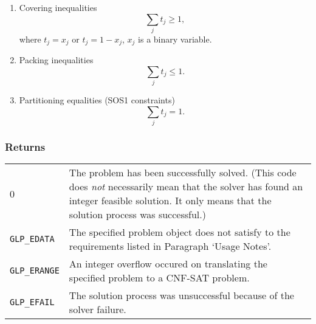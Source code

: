\documentclass[11pt,draft]{article}
\begin{document}
\begin{enumerate}
\item Covering inequalities
$$\sum_{j}t_j\geq 1,$$
where $t_j=x_j$ or $t_j=1-x_j$, $x_j$ is a binary variable.

\item Packing inequalities
$$\sum_{j}t_j\leq 1.$$

\item Partitioning equalities (SOS1 constraints)
$$\sum_{j}t_j=1.$$
\end{enumerate}

\subsubsection*{Returns}

\begin{tabular}{@{}p{25mm}p{97.3mm}@{}}
0 & The problem has been successfully solved. (This code does {\it not}
necessarily mean that the solver has found an integer feasible solution.
It only means that the solution process was successful.)\\

\verb|GLP_EDATA| & The specified problem object does not satisfy to the
requirements listed in Paragraph `Usage Notes'.\\

\verb|GLP_ERANGE| & An integer overflow occured on translating the
specified problem to a CNF-SAT problem.\\

\verb|GLP_EFAIL| & The solution process was unsuccessful because of the
solver failure.\\
\end{tabular}
\end{document}
